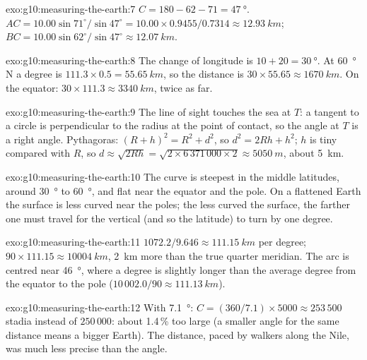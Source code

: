 \begin{solution}{exo:g10:measuring-the-earth:7}
$C = 180 - 62 - 71 = \qty{47}{\degree}$.
$AC = 10.00 \sin 71^\circ/\sin 47^\circ = 10.00 \times 0.9455/0.7314 \approx
\qty{12.93}{km}$; $BC = 10.00 \sin 62^\circ/\sin 47^\circ \approx
\qty{12.07}{km}$.
\end{solution}

\begin{solution}{exo:g10:measuring-the-earth:8}
The change of longitude is $10 + 20 = \qty{30}{\degree}$. At
\qty{60}{\degree} N a degree is $111.3 \times 0.5 = \qty{55.65}{km}$, so the
distance is $30 \times 55.65 \approx \qty{1670}{km}$. On the equator:
$30 \times 111.3 \approx \qty{3340}{km}$, twice as far.
\end{solution}

\begin{solution}{exo:g10:measuring-the-earth:9}
The line of sight touches the sea at $T$: a tangent to a circle is
perpendicular to the radius at the point of contact, so the angle at $T$ is
a right angle. Pythagoras: $(R+h)^2 = R^2 + d^2$, so $d^2 = 2Rh + h^2$; $h$ is
tiny compared with $R$, so $d \approx \sqrt{2Rh} = \sqrt{2 \times
6\,371\,000 \times 2} \approx \qty{5050}{m}$, about \qty{5}{km}.
\end{solution}

\begin{solution}{exo:g10:measuring-the-earth:10}
The curve is steepest in the middle latitudes, around \qty{30}{\degree} to
\qty{60}{\degree}, and flat near the equator and the pole. On a flattened
Earth the surface is less curved near the poles; the less curved the surface,
the farther one must travel for the vertical (and so the latitude) to turn by
one degree.
\end{solution}

\begin{solution}{exo:g10:measuring-the-earth:11}
$1072.2/9.646 \approx \qty{111.15}{km}$ per degree; $90 \times 111.15
\approx \qty{10004}{km}$, \qty{2}{km} more than the true quarter meridian.
The arc is centred near \qty{46}{\degree}, where a degree is slightly longer
than the average degree from the equator to the pole
($10\,002.0/90 \approx \qty{111.13}{km}$).
\end{solution}

\begin{solution}{exo:g10:measuring-the-earth:12}
With \qty{7.1}{\degree}: $C = (360/7.1) \times 5000 \approx 253\,500$ stadia
instead of $250\,000$: about 1.4\,\% too large (a smaller angle for the same
distance means a bigger Earth). The distance, paced by walkers along the
Nile, was much less precise than the angle.
\end{solution}

